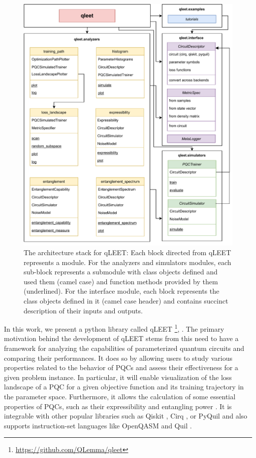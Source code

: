 \begin{figure}[!th]
    \centering
    \includegraphics[width=0.65\linewidth]{figures/qleet/qleet-architecture.pdf}
    \caption[The architecture stack for qLEET]{The architecture stack for qLEET: Each block directed from qLEET represents a module. For the analyzers and simulators modules, each sub-block represents a submodule with class objects defined and used them (camel case) and function methods provided by them (underlined). For the interface module, each block represents the class objects defined in it (camel case header) and contains succinct description of their inputs and outputs.}
    \label{fig:qleet-architecture}
\end{figure}

In this work, we present a python library called qLEET \footnote{\href{https://github.com/QLemma/qleet}{https://github.com/QLemma/qleet}}, \cite{qleet-zenodo}. The primary motivation behind the development of qLEET stems from this need to have a framework for analyzing the capabilities of parameterized quantum circuits and comparing their performances. It does so by allowing users to study various properties related to the behavior of PQCs and assess their effectiveness for a given problem instance. In particular, it will enable visualization of the loss landscape of a PQC for a given objective function and its training trajectory in the parameter space. Furthermore, it allows the calculation of some essential properties of PQCs, such as their expressibility and entangling power \cite{10.1002/qute.201900070}. It is integrable with other popular libraries such as Qiskit \cite{comp_qiskit}, Cirq \cite{comp_cirq}, or PyQuil \cite{ccquad_Pyquil} and also supports instruction-set languages like OpenQASM \cite{2021arXiv210414722C} and Quil \cite{ccquad_Pyquil}.

